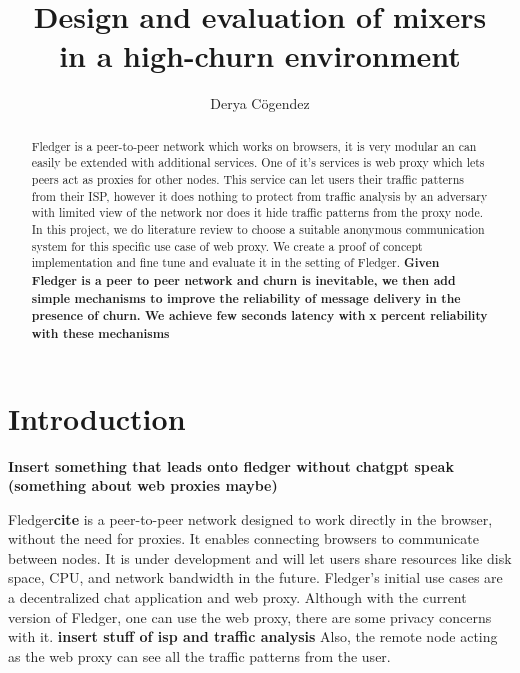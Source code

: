 \documentclass[a4paper,11pt,oneside]{report}
\title{Design and evaluation of mixers\\in a high-churn environment}
\author{Derya Cögendez}
\begin{document}
\maketitle
\makeacks

\begin{abstract}
Fledger is a peer-to-peer network which works on browsers, it is very modular an can easily be extended with additional services. One of it's services is web proxy which lets peers act as proxies for other nodes. This service can let users their traffic patterns from their ISP, however it does nothing to protect from traffic analysis by an adversary with limited view of the network nor does it hide traffic patterns from the proxy node. In this project, we do literature review to choose a suitable anonymous communication system for this specific use case of web proxy. We create a proof of concept implementation and fine tune and evaluate it in the setting of Fledger. \textbf{Given Fledger is a peer to peer network and churn is inevitable, we then add simple mechanisms to improve the reliability of message delivery in the presence of churn. We achieve few seconds latency with }\textbf{x percent reliability with these mechanisms}
\end{abstract}

\maketoc

\chapter{Introduction}

\textbf{Insert something that leads onto fledger without chatgpt speak (something about web proxies maybe)}

Fledger\textbf{cite} is a peer-to-peer network designed to work directly in the browser, without the need for proxies. It enables connecting browsers to communicate between nodes. It is under development and will let users share resources like disk space, CPU, and network bandwidth in the future. Fledger's initial use cases are a decentralized chat application and web proxy. Although with the current version of Fledger, one can use the web proxy, there are some privacy concerns with it. \textbf{insert stuff of isp and traffic analysis} Also, the remote node acting as the web proxy can see all the traffic patterns from the user. 
\end{document}
